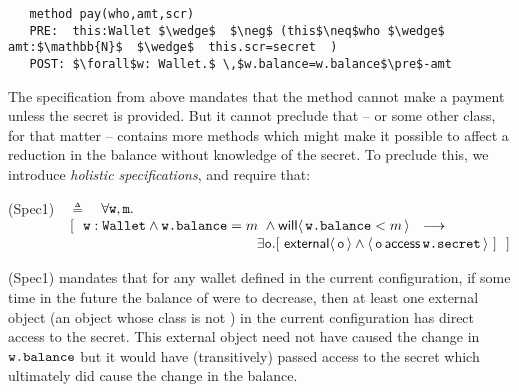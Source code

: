 \begin{lstlisting}
   method pay(who,amt,scr)
   PRE:  this:Wallet $\wedge$  $\neg$ (this$\neq$who $\wedge$ amt:$\mathbb{N}$  $\wedge$  this.scr=secret  )
   POST: $\forall$w: Wallet.$ \,$w.balance=w.balance$\pre$-amt 
 \end{lstlisting}
\vspace{-.2in}
The specification from above mandates that the method  cannot make a payment unless the secret is
provided. But it cannot preclude that  -- or some other class, for that matter -- contains more methods 
which might make it possible to affect a reduction in the balance   without knowledge of the
secret. To preclude this, we introduce \emph{holistic specifications}, and require that:

\vspace{.02in}
(Spec1)\ \  $\triangleq$\ \ $\forall {\mbox{\tt{w}}},{\mbox{\tt{m}}}.$\\
$\strut \hspace{.6in} [\ \ \prg{w}:\prg{Wallet} \wedge \prg{w.balance}=m\ \wedge \Future{\prg{w.balance}<m} \ \    
    \longrightarrow \hfill $ \\
  $ \strut \hspace{6.3cm} 
  \exists \prg{o}. [\  \External{\prg{o}} \wedge  \CanAccess{\prg{o}}{\prg{w.secret}}\ ]  \  \ ] \hfill $
\vspace{.02in}

(Spec1) mandates that for any wallet  defined in the current configuration, if some time in the future the balance of
\prg{w} were to decrease, then at least one external object (\ie an object whose class is not \prg{Wallet}) in the current configuration
has direct access to the secret. This external object need not have caused the change in ${\mbox{\tt{w.balance}}}$ but it would  have (transitively) passed access to the secret which ultimately did cause the change in the balance.

